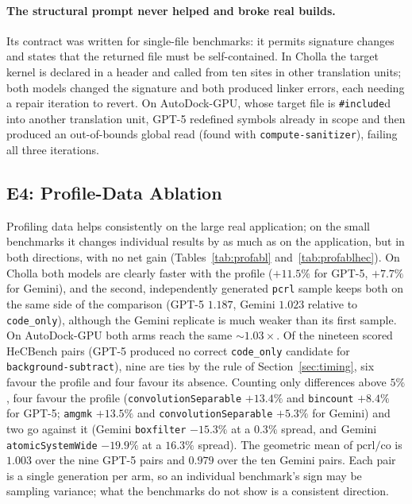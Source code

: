 \paragraph{The structural prompt never helped and broke real builds.}
Its contract was written for single-file benchmarks: it permits signature changes and states that the
returned file must be self-contained. In Cholla the target kernel is declared in a header and called
from ten sites in other translation units; both models changed the signature and both produced linker
errors, each needing a repair iteration to revert. On AutoDock-GPU, whose target file is
\texttt{\#include}d into another translation unit, GPT-5 redefined symbols already in scope and then
produced an out-of-bounds global read (found with \texttt{compute-sanitizer}), failing all three
iterations.

\subsection{E4: Profile-Data Ablation}
\label{sec:evidence}
\label{sec:profabl}
Profiling data helps consistently on the large real application; on the small benchmarks it changes
individual results by as much as on the application, but in both directions, with no net gain
(Tables~\ref{tab:profabl} and~\ref{tab:profablhec}). On Cholla both models are clearly faster with
the profile ($+11.5\%$ for GPT-5, $+7.7\%$ for Gemini), and the second, independently generated
\texttt{pcrl} sample keeps both on the same side of the comparison (GPT-5 $1.187$, Gemini $1.023$
relative to \texttt{code\_only}), although the Gemini replicate is much weaker than its first sample.
On AutoDock-GPU both arms reach the same ${\sim}1.03\times$. Of the nineteen scored HeCBench pairs
(GPT-5 produced no correct \texttt{code\_only} candidate for \texttt{background-subtract}), nine are
ties by the rule of Section~\ref{sec:timing}, six favour the profile and four favour its absence.
Counting only differences above $5\%$, four favour the profile (\texttt{convolutionSeparable}
$+13.4\%$ and \texttt{bincount} $+8.4\%$ for GPT-5; \texttt{amgmk} $+13.5\%$ and
\texttt{convolutionSeparable} $+5.3\%$ for Gemini) and two go against it (Gemini \texttt{boxfilter}
$-15.3\%$ at a $0.3\%$ spread, and Gemini \texttt{atomicSystemWide} $-19.9\%$ at a $16.3\%$ spread).
The geometric mean of $\mathrm{pcrl}/\mathrm{co}$ is $1.003$ over the nine GPT-5 pairs and $0.979$
over the ten Gemini pairs. Each pair is a single generation per arm, so an individual benchmark's sign
may be sampling variance; what the benchmarks do not show is a consistent direction.

